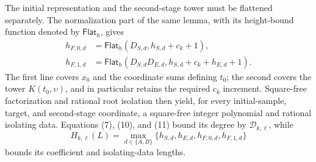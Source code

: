 The initial representation and the second-stage tower must be flattened separately.  The normalization part of the same lemma, with its height-bound function denoted by \(\mathsf{Flat}_h\), gives
\[
\begin{aligned}
h_{F,0,d}
&=\mathsf{Flat}_h(D_{S,d},h_{S,d}+c_k+1),\\
h_{F,1,d}
&=\mathsf{Flat}_h
  (D_{S,d}D_{E,d},h_{S,d}+c_k+h_{E,d}+1).                 \tag{21}
\end{aligned}
\]
The first line covers \(x_0\) and the coordinate sums defining \(t_0\); the second covers the tower \(K(t_0,\upsilon)\), and in particular retains the required \(c_k\) increment.  Square-free factorization and rational root isolation then yield, for every initial-sample, target, and second-stage coordinate, a square-free integer polynomial and rational isolating data.  Equations (7), (10), and (11) bound its degree by \(\mathcal D_{k,\ell}\), while
\[
H_{k,\ell}(L)
=\max_{d\in\{A,B\}}
  \{h_{S,d},h_{E,d},h_{F,0,d},h_{F,1,d}\}                \tag{22}
\]
bounds its coefficient and isolating-data lengths.

